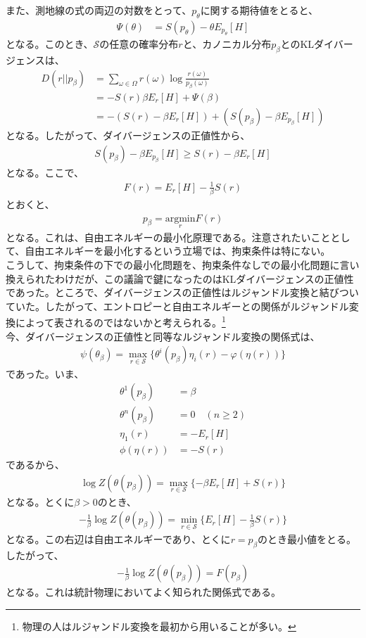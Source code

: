 \documentclass[a4paper,11pt]{jsarticle}
\numberwithin{equation}{section}
\begin{document}
また、測地線の式の両辺の対数をとって、$p_{\theta}$に関する期待値をとると、
\begin{align}
    \Psi(\theta) &= S(p_{\theta}) - \theta E_{p_{\theta}}[H]
\end{align}
となる。このとき、$\mathcal{S}$の任意の確率分布$r$と、カノニカル分布$p_{\beta}$とのKLダイバージェンスは、
\begin{align}
    D(r||p_{\beta}) &= \sum_{\omega \in \Omega} r(\omega) \log \frac{r(\omega)}{p_{\beta}(\omega)}\\
    &= -S(r) \beta E_r[H] + \Psi(\beta)\\
    &= -(S(r) - \beta E_r[H]) + (S(p_{\beta}) - \beta E_{p_{\beta}}[H])
\end{align}
となる。したがって、ダイバージェンスの正値性から、
\begin{align}
    S(p_{\beta}) - \beta E_{p_{\beta}}[H] \geq S(r) - \beta E_r[H]
\end{align}
となる。ここで、
\begin{align}
    F(r) = E_r[H] - \frac{1}{\beta}S(r)
\end{align}
とおくと、
\begin{align}
    p_{\beta} = \underset{r}{\text{argmin}} F(r)
\end{align}
となる。これは、自由エネルギーの最小化原理である。注意されたいこととして、自由エネルギーを最小化するという立場では、拘束条件は特にない。\\
こうして、拘束条件の下での最小化問題を、拘束条件なしでの最小化問題に言い換えられたわけだが、この議論で鍵になったのはKLダイバージェンスの正値性であった。ところで、ダイバージェンスの正値性はルジャンドル変換と結びついていた。したがって、エントロピーと自由エネルギーとの関係がルジャンドル変換によって表されるのではないかと考えられる。\footnote{物理の人はルジャンドル変換を最初から用いることが多い。}\\
今、ダイバージェンスの正値性と同等なルジャンドル変換の関係式は、
\begin{align}
    \psi(\theta_\beta) = \max_{r \in \mathcal{S}}\{\theta^i(p_\beta)\eta_i(r) - \varphi(\eta(r))\}
\end{align}
であった。いま、
\begin{align}
    \theta^1(p_\beta) &= \beta\\
    \theta^n(p_\beta) &= 0 \quad (n\geq 2)\\
    \eta_1(r) &= -E_r[H]\\
    \phi(\eta(r)) &= -S(r)
\end{align}
であるから、
\begin{align}
    \log Z(\theta(p_\beta)) = \max_{r \in \mathcal{S}}\{-\beta E_r[H] + S(r)\}
\end{align}
となる。とくに$\beta >0$のとき、
\begin{align}
    -\frac{1}{\beta}\log Z(\theta(p_\beta)) = \min_{r \in \mathcal{S}}\{E_r[H] - \frac{1}{\beta}S(r)\}
\end{align}
となる。この右辺は自由エネルギーであり、とくに$r = p_\beta$のとき最小値をとる。したがって、
\begin{align}
    -\frac{1}{\beta}\log Z(\theta(p_\beta)) = F(p_\beta)
\end{align}
となる。これは統計物理においてよく知られた関係式である。\\
\end{document}
